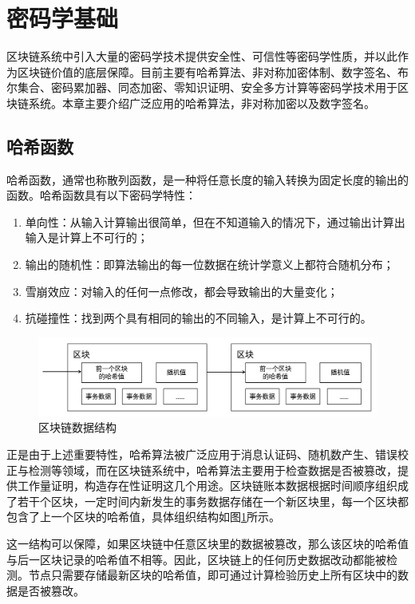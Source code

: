 \section{密码学基础}

区块链系统中引入大量的密码学技术提供安全性、可信性等密码学性质，并以此作为区块链价值的底层保障。目前主要有哈希算法、非对称加密体制、数字签名、布尔集合、密码累加器、同态加密、零知识证明、安全多方计算等密码学技术用于区块链系统。本章主要介绍广泛应用的哈希算法，非对称加密以及数字签名。

\subsection{哈希函数}
\label{subsec:hash}

哈希函数，通常也称散列函数，是一种将任意长度的输入转换为固定长度的输出的函数。哈希函数具有以下密码学特性：
\begin{enumerate}
\item 单向性：从输入计算输出很简单，但在不知道输入的情况下，通过输出计算出输入是计算上不可行的；
\item 输出的随机性：即算法输出的每一位数据在统计学意义上都符合随机分布；
\item 雪崩效应：对输入的任何一点修改，都会导致输出的大量变化；
\item 抗碰撞性：找到两个具有相同的输出的不同输入，是计算上不可行的。
\end{enumerate}

\begin{figure}
\centering  
\includegraphics [width=400pt]{figures/hashchain.png}
\caption{区块链数据结构}
\label{fig:hashchain}
\end{figure}

正是由于上述重要特性，哈希算法被广泛应用于消息认证码、随机数产生、错误校正与检测等领域，而在区块链系统中，哈希算法主要用于检查数据是否被篡改，提供工作量证明，构造存在性证明这几个用途。区块链账本数据根据时间顺序组织成了若干个区块，一定时间内新发生的事务数据存储在一个新区块里，每一个区块都包含了上一个区块的哈希值，具体组织结构如图\ref{fig:hashchain}所示。

这一结构可以保障，如果区块链中任意区块里的数据被篡改，那么该区块的哈希值与后一区块记录的哈希值不相等。因此，区块链上的任何历史数据改动都能被检测。节点只需要存储最新区块的哈希值，即可通过计算检验历史上所有区块中的数据是否被篡改。

